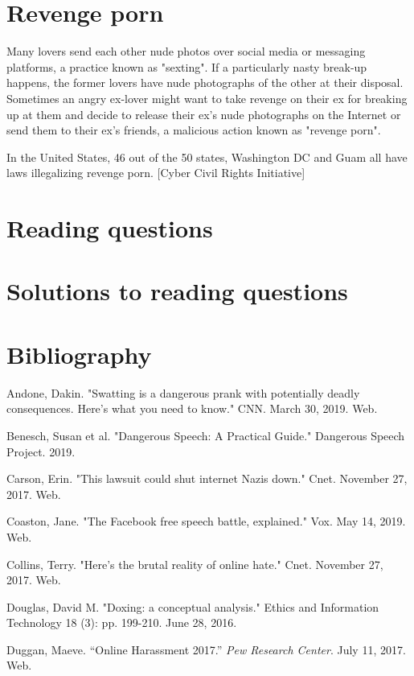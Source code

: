 \documentclass[class=book, crop=false]{standalone}
\begin{document}
\section{Revenge porn}

Many lovers send each other nude photos over social media or messaging platforms, a practice known as "sexting". If a particularly nasty break-up happens, the former lovers have nude photographs of the other at their disposal. Sometimes an angry ex-lover might want to take revenge on their ex for breaking up at them and decide to release their ex's nude photographs on the Internet or send them to their ex's friends, a malicious action known as "revenge porn".

In the United States, 46 out of the 50 states, Washington DC and Guam all have laws illegalizing revenge porn. [Cyber Civil Rights Initiative]

\section{Reading questions}

\section{Solutions to reading questions}

\section{Bibliography}

Andone, Dakin. "Swatting is a dangerous prank with potentially deadly consequences. Here's what you need to know." CNN. March 30, 2019. Web.

Benesch, Susan et al. "Dangerous Speech: A Practical Guide." Dangerous Speech Project. 2019.

Carson, Erin. "This lawsuit could shut internet Nazis down." Cnet. November 27, 2017. Web.

Coaston, Jane. "The Facebook free speech battle, explained." Vox. May 14, 2019. Web.

Collins, Terry. "Here's the brutal reality of online hate." Cnet. November 27, 2017. Web.

Douglas, David M. "Doxing: a conceptual analysis." Ethics and Information Technology 18 (3): pp. 199-210. June 28, 2016.

Duggan, Maeve. “Online Harassment 2017.” \textit{Pew Research Center}. July 11, 2017. Web.
\end{document}
